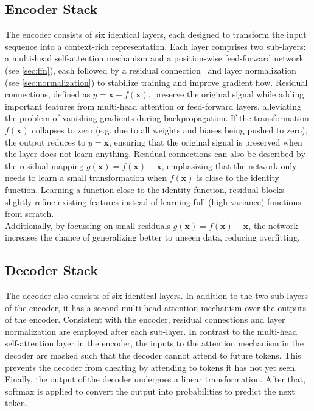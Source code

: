 \subsection{Encoder Stack} 
The encoder consists of six identical layers, each designed to transform the input sequence into a context-rich representation.
Each layer comprises two sub-layers: a multi-head self-attention mechanism and a position-wise feed-forward network (see \cref{sec:ffn}), each followed by a residual connection~\cite{he2015deepresiduallearningimage} and layer normalization~\cite{ba2016layernormalization} (see \cref{sec:normalization}) to stabilize training and improve gradient flow.
Residual connections, defined as  \(y = \mathbf{x} + f(\mathbf{x})\), preserve the original signal while adding important features from multi-head attention or feed-forward layers, alleviating the problem of vanishing gradients during backpropagation.
If the transformation \(f(\mathbf{x})\) collapses to zero (e.g. due to all weights and biases being pushed to zero), the output reduces to \(y = \mathbf{x}\), ensuring that the original signal is preserved when the layer does not learn anything.
Residual connections can also be described by the residual mapping \(g(\mathbf{x}) = f(\mathbf{x}) - \mathbf{x}\), emphasizing that the network only needs to learn a small transformation when \(f(\mathbf{x})\) is close to the identity function.
Learning a function close to the identity function, residual blocks slightly refine existing features instead of learning full (high variance) functions from scratch. \\
Additionally, by focussing on small residuals \(g(\mathbf{x}) = f(\mathbf{x}) - \mathbf{x}\), the network increases the chance of generalizing better to unseen data, reducing overfitting.

\subsection{Decoder Stack} 
The decoder also consists of six identical layers.
In addition to the two sub-layers of the encoder, it has a second multi-head attention mechanism over the outputs of the encoder.
Consistent with the encoder, residual connections and layer normalization are employed after each sub-layer.
In contrast to the multi-head self-attention layer in the encoder, the inputs to the attention mechanism in the decoder are masked such that the decoder cannot attend to future tokens.
This prevents the decoder from cheating by attending to tokens it has not yet seen.
Finally, the output of the decoder undergoes a linear transformation. After that, softmax is applied to convert the output into probabilities to predict the next token.

